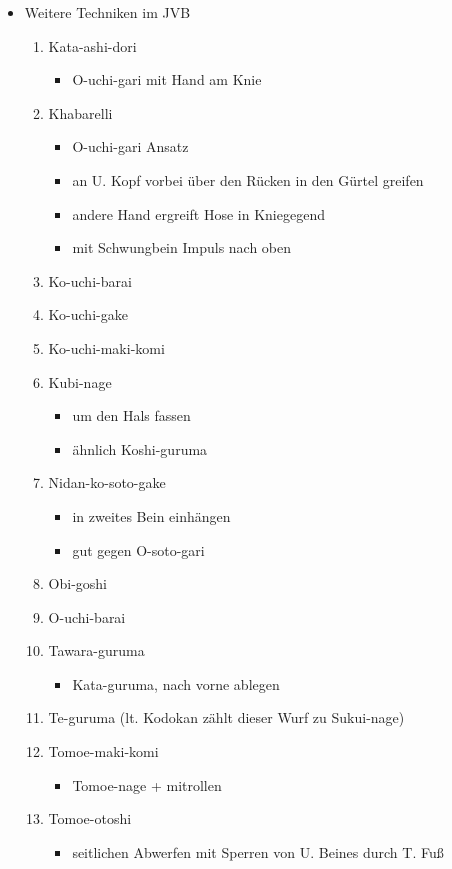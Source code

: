 \documentclass[justified, a4paper, notitlepage, captions=tableheading, nobib]{tufte-handout}
\begin{document}
\begin{itemize}
\item Weitere Techniken im JVB
\begin{enumerate}
\item Kata-ashi-dori
\begin{itemize}
\item O-uchi-gari mit Hand am Knie
\end{itemize}
\item Khabarelli
\begin{itemize}
\item O-uchi-gari Ansatz
\item an U. Kopf vorbei über den Rücken in den Gürtel greifen
\item andere Hand ergreift Hose in Kniegegend
\item mit Schwungbein Impuls nach oben
\end{itemize}
\item Ko-uchi-barai
\item Ko-uchi-gake
\item Ko-uchi-maki-komi
\item Kubi-nage
\begin{itemize}
\item um den Hals fassen
\item ähnlich Koshi-guruma
\end{itemize}
\item Nidan-ko-soto-gake
\begin{itemize}
\item in zweites Bein einhängen
\item gut gegen O-soto-gari
\end{itemize}
\item Obi-goshi
\item O-uchi-barai
\item Tawara-guruma
\begin{itemize}
\item Kata-guruma, nach vorne ablegen
\end{itemize}
\item Te-guruma (lt. Kodokan zählt dieser Wurf zu Sukui-nage)
\item Tomoe-maki-komi
\begin{itemize}
\item Tomoe-nage + mitrollen
\end{itemize}
\item Tomoe-otoshi
\begin{itemize}
\item seitlichen Abwerfen mit Sperren von U. Beines durch T. Fuß

\end{itemize}
\end{enumerate}
\end{itemize}
\end{document}
